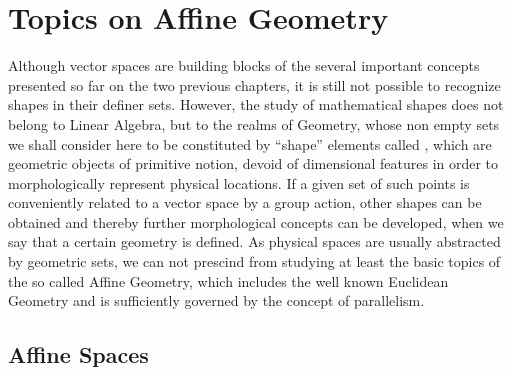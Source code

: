 
\chapter{Topics on Affine Geometry}

Although vector spaces are building blocks of the several important concepts presented so far on the two previous chapters, it is still not possible to recognize shapes in their definer sets. However, the study of mathematical shapes does not belong to Linear Algebra, but to the realms of Geometry, whose non empty sets we shall consider here to be constituted by ``shape'' elements called , which are geometric objects of primitive notion, devoid of dimensional features in order to morphologically represent physical locations. If a given set of such points is conveniently related to a vector space by a group action, other shapes can be obtained and thereby further morphological concepts can be developed, when we say that a certain geometry is defined. As physical spaces are usually abstracted by geometric sets, we can not prescind from studying at least the basic topics of the so called Affine Geometry, which includes the well known Euclidean Geometry and is sufficiently governed by the concept of parallelism.


\section{Affine Spaces}\label{sec:affine}

